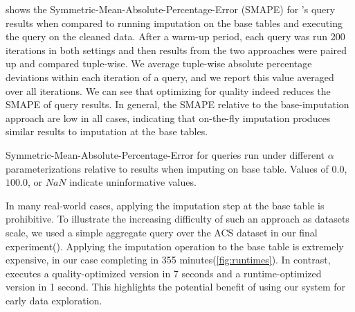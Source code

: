  shows the Symmetric-Mean-Absolute-Percentage-Error (SMAPE) for
\ProjectName{}'s query results when compared to running imputation on the base tables and
executing the query on the cleaned data. After a warm-up period, each query was run 200 iterations in both settings
and then results from the two approaches were paired up and compared tuple-wise. We average
tuple-wise absolute percentage deviations within each iteration of a query, and we report
this value averaged over all iterations.  We can see that optimizing for quality indeed
reduces the SMAPE of query results. In general, the SMAPE relative to the base-imputation
approach are low in all cases, indicating that on-the-fly imputation produces similar
results to imputation at the base tables.

\begin{table}
\centering

\caption{Symmetric-Mean-Absolute-Percentage-Error for queries run under different $\alpha$
    parameterizations relative to results when imputing on base table. Values of $0.0$,
    $100.0$, or $NaN$ indicate uninformative values.} %
\label{table:smape}
\end{table}

In many real-world cases, applying the imputation step at the base table is prohibitive.
To illustrate the increasing difficulty of such an approach as datasets scale, we used a simple
aggregate query over the ACS dataset in our final experiment().
Applying the imputation operation to the base table is extremely expensive, in our case
completing in 355 minutes(\ref{fig:runtimes}). In contrast, \ProjectName{} executes a quality-optimized version
in 7 seconds and a runtime-optimized version in 1 second. This highlights the potential
benefit of using our system for early data exploration.

